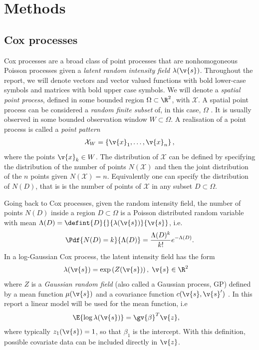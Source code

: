 \documentclass[12pt,a4paper,oneside,article]{memoir}
\begin{document}
\section{Methods}

\subsection{Cox processes}

Cox processes
are a broad class of point processes that are nonhomogoneous Poisson processes given
a \emph{latent random intensity field} $\lambda(\v{s})$. Throughout the report, we will denote 
vectors and vector valued functions with bold lower-case symbols and matrices with bold
upper case symbols. We will denote a \emph{spatial point process}, defined in some bounded region
$\Omega\subset\R^2$, with $\mathcal{X}$. A spatial point process can be considered a 
\emph{random finite subset} of, in this case, $\Omega$ \cite{Moller2007}. It is usually observed
in some bounded observation window $W\subset\Omega$.
A realisation of a point process is called a \emph{point pattern}
\begin{align}
	\mathcal{X}_W=\left\{\v{x}_1,\dots,\v{x}_n\right\},
	\label{eq:point_pattern}
\end{align}
where the points $\v{x}_k\in W$. 
The distribution of $\mathcal{X}$ can be defined by specifying the distribution of
the number of points $N(\mathcal{X})$ and then the joint distribution of the $n$ points given
$N(\mathcal{X})=n$. Equivalently one can specify the distribution of $N(D)$, that is
is the number of points of $\mathcal{X}$ in any subset $D\subset \Omega$. 

Going back to Cox processes, given the random intensity field, the number of points $N(D)$ inside a region
$D\subset\Omega$ is a Poisson distributed random variable with mean $\Lambda(D)=\defint{D}{}{\lambda(\v{s})}{\v{s}}$, i.e.
\begin{align}
	\Pdf{N(D)=k}{\Lambda(D)}=\frac{\Lambda(D)^k}{k!}e^{-\Lambda(D)}.
	\label{eq:poisson}
\end{align}
In a log-Gaussian Cox process, the latent intensity field has the form
\begin{align}
	\lambda(\v{s})&=\exp\left(Z(\v{s})\right),\;\v{s}\in\R^2
	\label{eq:lambda_lgcp}
\end{align}
where $Z$ is a \emph{Gaussian random field} (also called a Gaussian process, GP) defined by a 
mean function $\mu(\v{s})$ and a covariance function $c(\v{s},\v{s}')$ \cite{Moller2007}. 
In this report
a linear model will be used for the mean function, i.e
\begin{align}
	\E{\log\lambda(\v{s})}&=\gv{\beta}^T\v{z},
	\label{eq:lambda_mean}
\end{align}
where typically $z_1(\v{s})=1$, so that $\beta_1$ is the intercept. With this definition, possible
covariate data can be included directly in $\v{z}$. 
\end{document}
